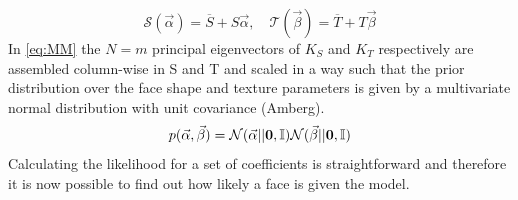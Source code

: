 \begin{equation}
\label{eq:MM}
\mathcal{S}(\vec\alpha)=\overline{S}+S\vec\alpha, \quad \mathcal{T}(\vec\beta)=\overline{T}+T\vec\beta
\end{equation}
In \eqref{eq:MM} the $N=m$ principal eigenvectors of $K_{S}$ and $K_{T}$ respectively are assembled column-wise in S and T and scaled in a way such that the prior distribution over the face shape and texture parameters is given by a multivariate normal distribution with unit covariance (Amberg).
\begin{equation}
    p(\vec\alpha, \vec\beta) = \mathcal{N}(\vec\alpha\vert|\textbf{0}, \mathbb{I})\mathcal{N}(\vec\beta\vert|\textbf{0}, \mathbb{I})
\end{equation}
Calculating the likelihood for a set of coefficients is straightforward and therefore it is now possible to find out how likely a face is given the model. 

